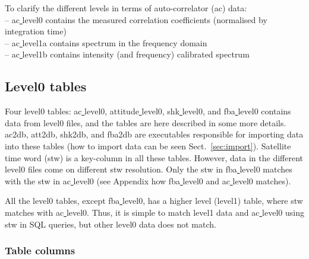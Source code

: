 \documentclass[12pt]{article}
\begin{document}
To clarify the different levels in terms of auto-correlator (ac) data:\\
-- ac\underline{ }level0 contains the measured correlation
coefficients (normalised by integration time)\\
-- ac\underline{ }level1a contains spectrum in the frequency domain\\
-- ac\underline{ }level1b contains intensity (and frequency) calibrated spectrum


\subsection{Level0 tables}
Four level0 tables: ac\underline{ }level0, attitude\underline{ }level0, 
shk\underline{ }level0, and fba\underline{ }level0 contains 
data from level0 files, and the tables are here described in 
some more details. 
ac2db, att2db, shk2db, and fba2db are executables responsible for importing
data into these tables (how to import data can be seen
Sect.~\ref{sec:import}).
Satellite time word (stw) is a key-column in all these tables.
However, data in the different level0 files come on different 
stw resolution. Only the stw in fba\underline{ }level0
matches with the stw in ac\underline{ }level0 (see Appendix
how fba\underline{ }level0 and ac\underline{ }level0 matches).
  
All the level0 tables, except fba\underline{ }level0, has a higher
level (level1) table, where stw matches with ac\underline{ }level0. 
Thus, it is simple to match level1 data and ac\underline{ }level0
using stw in SQL queries, but other level0 data does not match.


  


\clearpage
\newpage
\subsubsection*{Table columns}
\end{document}
